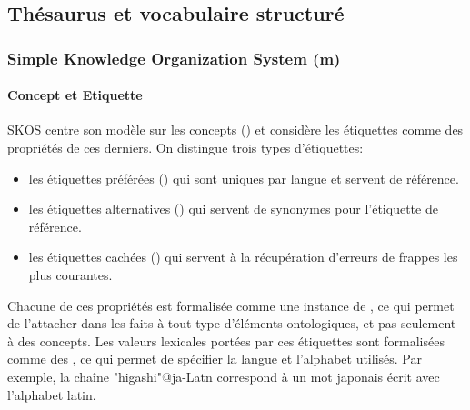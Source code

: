 \subsection{Thésaurus et vocabulaire structuré}\label{sec:thesaurus}
\subsubsection{Simple Knowledge Organization System (m)}\label{sec:skos}

\paragraph{Concept et Etiquette}
SKOS centre son modèle sur les concepts () et considère les étiquettes comme des propriétés de ces derniers. 
On distingue trois types d'étiquettes: 
\begin{itemize} 
	\item les étiquettes préférées () qui sont uniques par langue et servent de référence.
	\item les étiquettes alternatives () qui servent de synonymes pour l'étiquette de référence. 
	\item les étiquettes cachées () qui servent à la récupération d'erreurs de frappes les plus courantes. 
\end{itemize}
Chacune de ces propriétés est formalisée comme une instance de , ce qui permet de l'attacher dans les faits à tout type d'éléments ontologiques, et pas seulement à des concepts. 
Les valeurs lexicales portées par ces étiquettes sont formalisées comme des , ce qui permet de spécifier la langue et l'alphabet utilisés. 
Par exemple, la chaîne "higashi"@ja-Latn correspond à un mot japonais écrit avec l'alphabet latin.

